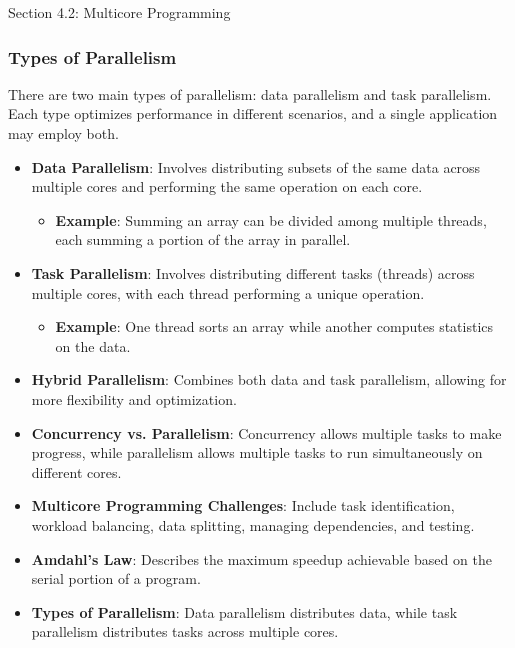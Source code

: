 \begin{notes}{Section 4.2: Multicore Programming}
\begin{highlight}
    \end{highlight}
    
    \subsubsection*{Types of Parallelism}
    
    There are two main types of parallelism: data parallelism and task parallelism. Each type optimizes performance in different scenarios, and a single application may employ both.
    
    \begin{highlight}
    
        \begin{itemize}
            \item \textbf{Data Parallelism}: Involves distributing subsets of the same data across multiple cores and performing the same operation on each core.
                \begin{itemize}
                    \item \textbf{Example}: Summing an array can be divided among multiple threads, each summing a portion of the array in parallel.
                \end{itemize}
            \item \textbf{Task Parallelism}: Involves distributing different tasks (threads) across multiple cores, with each thread performing a unique operation.
                \begin{itemize}
                    \item \textbf{Example}: One thread sorts an array while another computes statistics on the data.
                \end{itemize}
            \item \textbf{Hybrid Parallelism}: Combines both data and task parallelism, allowing for more flexibility and optimization.
        \end{itemize}
    
    \end{highlight}
    
    \begin{highlight}
    
        \begin{itemize}
            \item \textbf{Concurrency vs. Parallelism}: Concurrency allows multiple tasks to make progress, while parallelism allows multiple tasks to run simultaneously on different cores.
            \item \textbf{Multicore Programming Challenges}: Include task identification, workload balancing, data splitting, managing dependencies, and testing.
            \item \textbf{Amdahl's Law}: Describes the maximum speedup achievable based on the serial portion of a program.
            \item \textbf{Types of Parallelism}: Data parallelism distributes data, while task parallelism distributes tasks across multiple cores.
        \end{itemize}
    

\end{highlight}
\end{notes}
